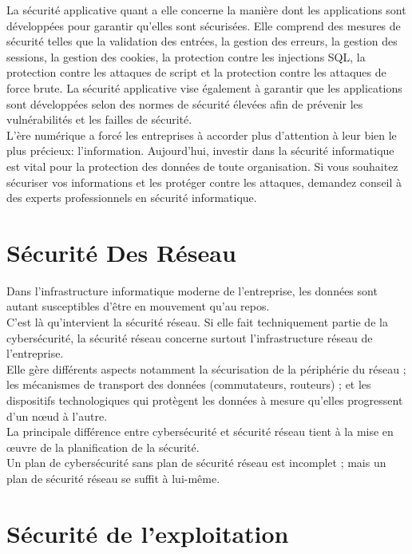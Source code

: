  La sécurité applicative quant a elle  concerne la manière dont les applications sont développées pour garantir qu'elles sont sécurisées. Elle comprend des mesures de sécurité telles que la validation des entrées, la gestion des erreurs, la gestion des sessions, la gestion des cookies, la protection contre les injections SQL, la protection contre les attaques de script et la protection contre les attaques de force brute. La sécurité applicative vise également à garantir que les applications sont développées selon des normes de sécurité élevées afin de prévenir les vulnérabilités et les failles de sécurité.\\
 
 L’ère numérique a forcé les entreprises à accorder plus d’attention à leur bien le plus précieux: l’information. Aujourd'hui, investir dans la sécurité informatique est vital pour la protection des données de toute organisation. Si vous souhaitez sécuriser vos informations et les protéger contre les attaques, demandez conseil à des experts professionnels en sécurité informatique.
 
 \section*{Sécurité Des Réseau}
 Dans l'infrastructure informatique moderne de l'entreprise, les données sont autant susceptibles d'être en mouvement qu'au repos.\\
  C'est là qu'intervient la sécurité réseau. Si elle fait techniquement partie de la cybersécurité, la sécurité réseau concerne surtout l'infrastructure réseau de l'entreprise.\\
   Elle gère différents aspects notamment la sécurisation de la périphérie du réseau ; les mécanismes de transport des données (commutateurs, routeurs) ; et les dispositifs technologiques qui protègent les données à mesure qu'elles progressent d'un nœud à l'autre.\\
    La principale différence entre cybersécurité et sécurité réseau tient à la mise en œuvre de la planification de la sécurité.\\
    Un plan de cybersécurité sans plan de sécurité réseau est incomplet ; mais un plan de sécurité réseau se suffit à lui-même.\\
 
 \section*{Sécurité de l'exploitation}
 
